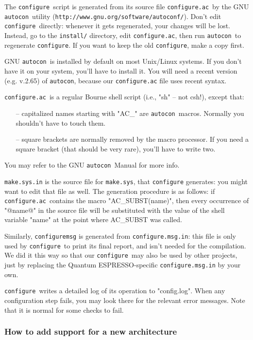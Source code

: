 \documentclass[12pt,a4paper]{article}
\def\qe{{\sc Quantum ESPRESSO}}
\def\configure{\texttt{configure}}
\def\configurac{\texttt{configure.ac}}
\def\autoconf{\texttt{autocon}}
\begin{document}
The \configure\ script is generated from its source file
\configurac\ by the GNU \autoconf\ utility
(\texttt{http://www.gnu.org/software/autoconf/}).  Don't edit \configure\
directly: whenever it gets regenerated, your changes will be lost.
Instead, go to the \texttt{install/} directory, edit \configurac, 
then run \autoconf\ to regenerate \configure. If you want 
to keep the old \configure, make a copy
first.

GNU \autoconf\ is installed by default on most Unix/Linux systems.  If
you don't have it on your system, you'll have to install it. You will
need a recent version (e.g. v.2.65) of \autoconf, because our \configurac
file uses recent syntax.

\configurac\ is a regular Bourne shell script (i.e., "sh" -- not csh!), 
except that:
\begin{itemize}
\item[--] capitalized names starting with "AC\_" are \autoconf\ macros.  Normally you shouldn't have to touch them.
\item[--] square brackets are normally removed by the macro processor.  If you need a square bracket (that should be very rare), you'll have to write two.
\end{itemize}

You may refer to the GNU \autoconf\ Manual for more info.

\texttt{make.sys.in} is the source file for \texttt{make.sys}, that \configure
generates: you might want to edit that file as well.  The generation
procedure is as follows: if \configurac\ contains the macro
"AC\_SUBST(name)", then every occurrence of "@name@" in the source
file will be substituted with the value of the shell variable "name"
at the point where AC\_SUBST was called.

Similarly, \configure\texttt{msg} is generated from \configure\texttt{.msg.in}: this
file is only used by \configure\ to print its final report, and isn't
needed for the compilation.  We did it this way so that our
\configure\ may also be used by other projects, just by replacing the
\qe-specific \configure\texttt{.msg.in} by your own.

\configure\ writes a detailed log of its operation to "config.log".
When any configuration step fails, you may look there for the relevant
error messages.  Note that it is normal for some checks to fail.

\subsubsection{How to add support for a new architecture}
\end{document}
